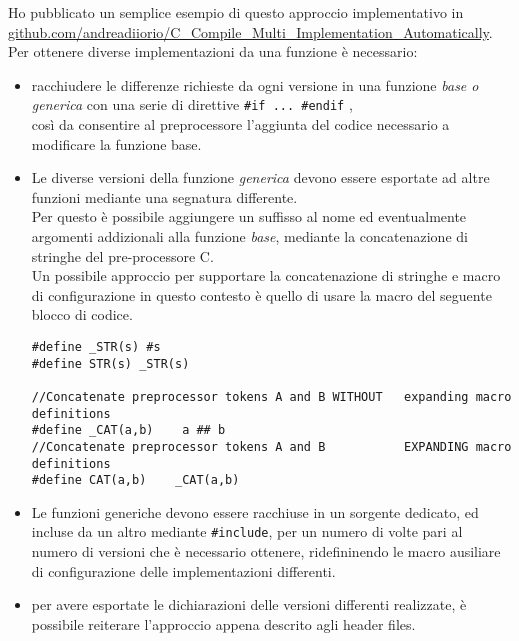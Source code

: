 Ho pubblicato un semplice esempio di questo approccio implementativo in \\ \url{github.com/andreadiiorio/C_Compile_Multi_Implementation_Automatically}.\\
\voidLine
Per ottenere diverse implementazioni da una funzione è necessario:
\begin{itemize}
	\item	racchiudere le differenze richieste da ogni versione in una funzione \emph{base o generica} con una serie di direttive \verb|#if ... #endif| ,\\
			così da consentire al preprocessore l'aggiunta del codice necessario a modificare la funzione base.%
	\item	Le diverse versioni della funzione \emph{generica} devono essere esportate ad altre funzioni mediante una segnatura differente.\\
			Per questo è possibile aggiungere un  suffisso al nome ed eventualmente argomenti addizionali alla funzione 
			\emph{base}, mediante la concatenazione di stringhe del pre-processore C.\\
			Un possibile approccio per supportare la concatenazione di stringhe e macro di configurazione
			in questo contesto è quello di usare la macro  del seguente blocco di codice.\\
			\begin{lstlisting}
#define _STR(s) #s
#define STR(s) _STR(s)

//Concatenate preprocessor tokens A and B WITHOUT   expanding macro definitions
#define _CAT(a,b)    a ## b
//Concatenate preprocessor tokens A and B           EXPANDING macro definitions
#define CAT(a,b)    _CAT(a,b)
			\end{lstlisting}
	\item	Le funzioni generiche devono essere racchiuse in un sorgente dedicato, ed incluse da un altro mediante \verb|#include|,
			per un numero di volte pari al numero di versioni che è necessario ottenere,
			ridefininendo le macro ausiliare di configurazione delle implementazioni differenti.
	\item	per avere esportate le dichiarazioni delle versioni differenti realizzate, è possibile reiterare l'approccio 
			appena descrito agli header files.
\end{itemize}
 
